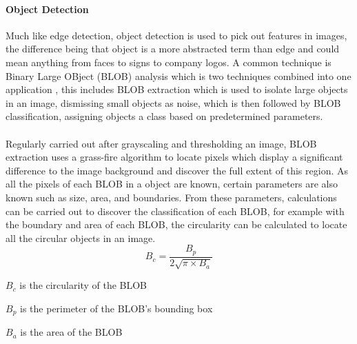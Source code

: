 	\paragraph{Object Detection}
	Much like edge detection, object detection is used to pick out features in images, the 
	difference being that object is a more abstracted term than edge and could mean anything from 
	faces to signs to company logos. A common technique is Binary Large OBject (BLOB) analysis 
	which is two techniques combined into one application \citep{introtoprocessing}, this includes 
	BLOB extraction which is used to isolate large objects in an image, dismissing small objects as 
	noise, which is then followed by BLOB classification, assigning objects a class based on 
	predetermined parameters.
	\\\\
	Regularly carried out after grayscaling and thresholding an image, BLOB extraction uses a grass-fire algorithm to locate pixels which display a significant difference to the image background and discover the full extent of this region. As all the pixels of each BLOB in a object are known, certain parameters are also known such as size, area, and boundaries. From these parameters, calculations can be carried out to discover the classification of each BLOB, for example with the boundary and area of each BLOB, the circularity can be calculated to locate all the circular objects in an image.
	\begin{equation}
		B_{c}=\frac{B_{p}}{2\sqrt{\pi \times B_{a}}}
	\end{equation}
	\begin{where}
		\item $B_{c}$ is the circularity of the BLOB
		\item $B_{p}$ is the perimeter of the BLOB's bounding box
		\item $B_{a}$ is the area of the BLOB
	\end{where}
